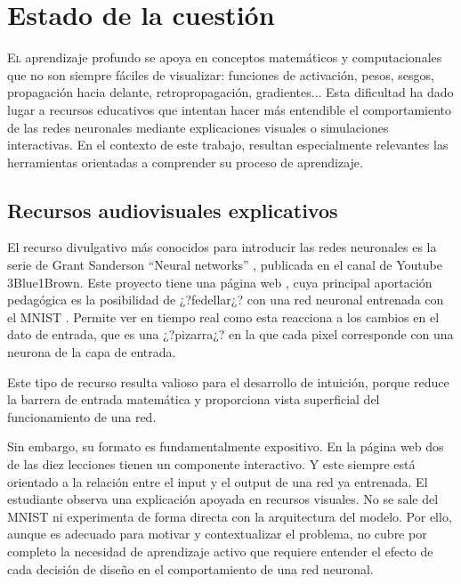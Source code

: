 \chapter{Estado de la cuestión}
\label{chap:estado_de_la_cuestion}

\lettrine{E}{l} aprendizaje profundo se apoya en conceptos matemáticos y computacionales que no son siempre fáciles de visualizar: funciones de activación, pesos, sesgos, propagación hacia delante, retropropagación, gradientes...
Esta dificultad ha dado lugar a recursos educativos que intentan hacer más entendible el comportamiento de las redes neuronales mediante explicaciones visuales o simulaciones interactivas.
En el contexto de este trabajo, resultan especialmente relevantes las herramientas orientadas a comprender su proceso de aprendizaje.


\section{Recursos audiovisuales explicativos}
\label{sec:sota_recursos_audiovisuales}

El recurso divulgativo más conocidos para introducir las redes neuronales es la serie de Grant Sanderson ``Neural networks'' \cite{SandersonNeuralNetworksYoutube}, publicada en el canal de Youtube 3Blue1Brown.
Este proyecto tiene una página web \cite{SandersonNeuralNetworks}, cuya principal aportación pedagógica es la posibilidad de ¿?fedellar¿? con una red neuronal entrenada con el MNIST \cite{MNIST}.
Permite ver en tiempo real como esta reacciona a los cambios en el dato de entrada, que es una ¿?pizarra¿? en la que cada pixel corresponde con una neurona de la capa de entrada.

Este tipo de recurso resulta valioso para el desarrollo de intuición, porque reduce la barrera de entrada matemática y proporciona vista superficial del funcionamiento de una red.

Sin embargo, su formato es fundamentalmente expositivo.
En la página web dos de las diez lecciones tienen un componente interactivo.
Y este siempre está orientado a la relación entre el input y el output de una red ya entrenada.
El estudiante observa una explicación apoyada en recursos visuales. No se sale del MNIST ni experimenta de forma directa con la arquitectura del modelo.
Por ello, aunque es adecuado para motivar y contextualizar el problema, no cubre por completo la necesidad de aprendizaje activo que requiere entender el efecto de cada decisión de diseño en el comportamiento de una red neuronal.

